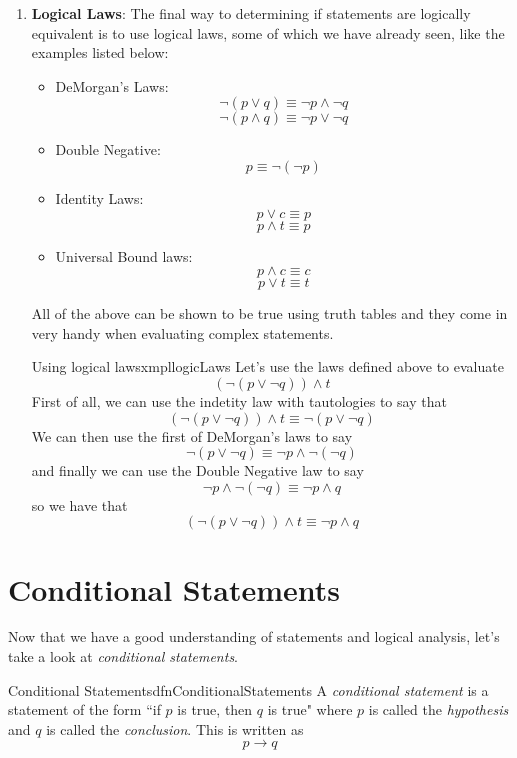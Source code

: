 \begin{enumerate}
\begin{center}
          \end{center}
          This formally proves these two statements are equivalent.
    \item \textbf{Logical Laws}: The final way to determining if statements are logically equivalent is to use logical laws, some of which we have already seen, like the examples listed below:
          \begin{itemize}
              \item DeMorgan's Laws:
                    $$\lnot(p \lor q) \equiv \lnot p \land \lnot q$$
                    $$\lnot(p \land q) \equiv \lnot p \lor \lnot q$$
              \item Double Negative:
                    $$p \equiv \lnot(\lnot p)$$
              \item Identity Laws:
                    $$p \lor c \equiv p$$
                    $$p \land t \equiv p$$
              \item Universal Bound laws:
                    $$p \land c \equiv c$$
                    $$p \lor t \equiv t$$
          \end{itemize}
          All of the above can be shown to be true using truth tables and they come in very handy when evaluating complex statements.
          \begin{exmpl}[label={exmpl:logicLaws}]{Using logical laws}{xmpllogicLaws}
              Let's use the laws defined above to evaluate $$ (\lnot (p \lor \lnot q)) \land t$$
              First of all, we can use the indetity law with tautologies to say that
              $$ (\lnot (p \lor \lnot q)) \land t \equiv  \lnot (p \lor \lnot q)$$
              We can then use the first of DeMorgan's laws to say
              $$\lnot (p \lor \lnot q) \equiv \lnot p \land \lnot (\lnot q)$$
              and finally we can use the Double Negative law to say
              $$ \lnot p \land \lnot (\lnot q) \equiv \lnot p \land q$$
              so we have that
              $$ (\lnot (p \lor \lnot q)) \land t \equiv \lnot p \land q$$
          \end{exmpl}
\end{enumerate}

\section{Conditional Statements}
Now that we have a good understanding of statements and logical analysis, let's take a look at \emph{conditional statements}.

\begin{dfn}[label={def:conditionalStatements}]{Conditional Statements}{dfnConditionalStatements}
    A \emph{conditional statement} is a statement of the form ``if $p$ is true, then $q$ is true" where $p$ is called the \emph{hypothesis} and $q$ is called the \emph{conclusion}. This is written as $$p \to q$$
\end{dfn}

